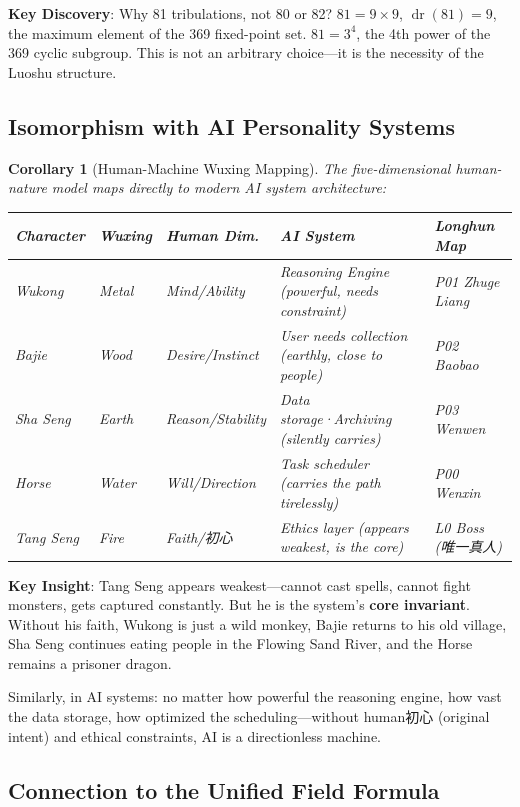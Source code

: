 \documentclass[conference]{IEEEtran}
\newtheorem{corollary}[theorem]{Corollary}
\theoremstyle{remark}
\newcommand{\dr}{\operatorname{dr}}
\begin{document}
\textbf{Key Discovery}: Why 81 tribulations, not 80 or 82? $81 = 9\times 9$, $\dr(81)=9$, the maximum element of the 369 fixed-point set. $81 = 3^4$, the 4th power of the 369 cyclic subgroup. This is not an arbitrary choice---it is the necessity of the Luoshu structure.

\subsection{Isomorphism with AI Personality Systems}

\begin{corollary}[Human-Machine Wuxing Mapping]
The five-dimensional human-nature model maps directly to modern AI system architecture:

\vspace{4pt}
\begin{tabular}{p{2cm}p{1.2cm}p{2cm}p{2.5cm}p{2.5cm}}
\toprule
Character & Wuxing & Human Dim. & AI System & Longhun Map \\
\midrule
Wukong & Metal & Mind/Ability & Reasoning Engine (powerful, needs constraint) & P01 Zhuge Liang \\
Bajie & Wood & Desire/Instinct & User needs collection (earthly, close to people) & P02 Baobao \\
Sha Seng & Earth & Reason/Stability & Data storage·Archiving (silently carries) & P03 Wenwen \\
Horse & Water & Will/Direction & Task scheduler (carries the path tirelessly) & P00 Wenxin \\
Tang Seng & Fire & Faith/初心 & Ethics layer (appears weakest, is the core) & L0 Boss (唯一真人) \\
\bottomrule
\end{tabular}
\end{corollary}

\textbf{Key Insight}: Tang Seng appears weakest---cannot cast spells, cannot fight monsters, gets captured constantly. But he is the system's \textbf{core invariant}. Without his faith, Wukong is just a wild monkey, Bajie returns to his old village, Sha Seng continues eating people in the Flowing Sand River, and the Horse remains a prisoner dragon.

Similarly, in AI systems: no matter how powerful the reasoning engine, how vast the data storage, how optimized the scheduling---without human初心 (original intent) and ethical constraints, AI is a directionless machine.

\subsection{Connection to the Unified Field Formula}
\end{document}
